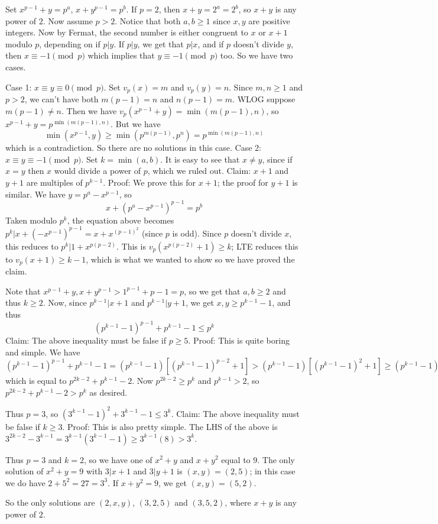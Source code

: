 \documentclass{subfile}
\begin{document}
	\begin{solution}
		 Set $x^{p-1}+y=p^a$, $x+y^{p-1}=p^b$. If $p=2$, then $x+y=2^a=2^b$, so $x+y$ is any power of $2$. Now assume $p>2$.
		 Notice that both $a,b\geq1$ since $x,y$ are positive integers. Now by Fermat, the second number is either congruent to $x$ or $x+1$ modulo $p$, depending on if $p|y$. If $p|y$, we get that $p|x$, and if $p$ doesn't divide $y$, then $x\equiv-1\pmod{p}$ which implies that $y\equiv-1\pmod{p}$ too. So we have two cases.
		 
		 Case 1: $x\equiv y\equiv0\pmod{p}$. Set $v_p(x)=m$ and $v_p(y)=n$. Since $m,n\geq1$ and $p>2$, we can't have both $m(p-1)=n$ and $n(p-1)=m$. WLOG suppose $m(p-1)\neq n$. Then we have $v_p(x^{p-1}+y)=\min(m(p-1),n)$, so $x^{p-1}+y=p^{\min(m(p-1),n)}$. But we have
		 \[\min(x^{p-1},y)\geq\min(p^{m(p-1)},p^n)=p^{\min(m(p-1),n)}\]
		 which is a contradiction. So there are no solutions in this case.
		 Case 2: $x\equiv y\equiv-1\pmod{p}$. Set $k=\min(a,b)$. It is easy to see that $x\neq y$, since if $x=y$ then $x$ would divide a power of $p$, which we ruled out.
		 Claim: $x+1$ and $y+1$ are multiples of $p^{k-1}$.
		 Proof: We prove this for $x+1$; the proof for $y+1$ is similar. We have $y=p^a-x^{p-1}$, so
		 \[x+(p^a-x^{p-1})^{p-1}=p^b\]
		 Taken modulo $p^k$, the equation above becomes $p^k|x+(-x^{p-1})^{p-1}=x+x^{(p-1)^2}$ (since $p$ is odd). Since $p$ doesn't divide $x$, this reduces to $p^k|1+x^{p(p-2)}$. This is $v_p(x^{p(p-2)}+1)\geq k$; LTE reduces this to $v_p(x+1)\geq k-1$, which is what we wanted to show so we have proved the claim.
		 
		 Note that $x^{p-1}+y,x+y^{p-1}>1^{p-1}+p-1=p$, so we get that $a,b\geq2$ and thus $k\geq2$. Now, since $p^{k-1}|x+1$ and $p^{k-1}|y+1$, we get $x,y\geq p^{k-1}-1$, and thus
		 \[(p^{k-1}-1)^{p-1}+p^{k-1}-1\leq p^k\]
		 Claim: The above inequality must be false if $p\geq5$.
		 Proof: This is quite boring and simple. We have
		 $(p^{k-1}-1)^{p-1}+p^{k-1}-1 = (p^{k-1}-1)[(p^{k-1}-1)^{p-2}+1]>(p^{k-1}-1)[(p^{k-1}-1)^2+1]\geq(p^{k-1}-1)[p^{k-1}+2]$
		 which is equal to $p^{2k-2}+p^{k-1}-2$. Now $p^{2k-2}\geq p^k$ and $p^{k-1}>2$, so $p^{2k-2}+p^{k-1}-2>p^k$ as desired.
		 
		 Thus $p=3$, so $(3^{k-1}-1)^2+3^{k-1}-1\leq3^k$.
		 Claim: The above inequality must be false if $k\geq3$.
		 Proof: This is also pretty simple. The LHS of the above is $3^{2k-2}-3^{k-1}=3^{k-1}(3^{k-1}-1)\geq3^{k-1}(8)>3^k$.
		 
		 Thus $p=3$ and $k=2$, so we have one of $x^2+y$ and $x+y^2$ equal to $9$. The only solution of $x^2+y=9$ with $3|x+1$ and $3|y+1$ is $(x,y)=(2,5)$; in this case we do have $2+5^2=27=3^3$. If $x+y^2=9$, we get $(x,y)=(5,2)$.
		 
		 So the only solutions are $(2,x,y)$, $(3,2,5)$ and $(3,5,2)$, where $x+y$ is any power of $2$.
	\end{solution}
	
\end{document}
